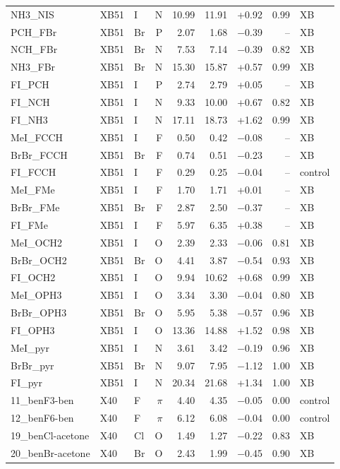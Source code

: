 \documentclass[journal=jcisd8,manuscript=suppinfo]{achemso}
\begin{document}
\begin{singlespace}
{\begin{longtable}{lllrrrrrl}
NH3\_NIS & XB51 & I & N & 10.99 & 11.91 & +0.92 & 0.99 & XB\\
PCH\_FBr & XB51 & Br & P & 2.07 & 1.68 & $-$0.39 & -- & XB\\
NCH\_FBr & XB51 & Br & N & 7.53 & 7.14 & $-$0.39 & 0.82 & XB\\
NH3\_FBr & XB51 & Br & N & 15.30 & 15.87 & +0.57 & 0.99 & XB\\
FI\_PCH & XB51 & I & P & 2.74 & 2.79 & +0.05 & -- & XB\\
FI\_NCH & XB51 & I & N & 9.33 & 10.00 & +0.67 & 0.82 & XB\\
FI\_NH3 & XB51 & I & N & 17.11 & 18.73 & +1.62 & 0.99 & XB\\
MeI\_FCCH & XB51 & I & F & 0.50 & 0.42 & $-$0.08 & -- & XB\\
BrBr\_FCCH & XB51 & Br & F & 0.74 & 0.51 & $-$0.23 & -- & XB\\
FI\_FCCH & XB51 & I & F & 0.29 & 0.25 & $-$0.04 & -- & control\\
MeI\_FMe & XB51 & I & F & 1.70 & 1.71 & +0.01 & -- & XB\\
BrBr\_FMe & XB51 & Br & F & 2.87 & 2.50 & $-$0.37 & -- & XB\\
FI\_FMe & XB51 & I & F & 5.97 & 6.35 & +0.38 & -- & XB\\
MeI\_OCH2 & XB51 & I & O & 2.39 & 2.33 & $-$0.06 & 0.81 & XB\\
BrBr\_OCH2 & XB51 & Br & O & 4.41 & 3.87 & $-$0.54 & 0.93 & XB\\
FI\_OCH2 & XB51 & I & O & 9.94 & 10.62 & +0.68 & 0.99 & XB\\
MeI\_OPH3 & XB51 & I & O & 3.34 & 3.30 & $-$0.04 & 0.80 & XB\\
BrBr\_OPH3 & XB51 & Br & O & 5.95 & 5.38 & $-$0.57 & 0.96 & XB\\
FI\_OPH3 & XB51 & I & O & 13.36 & 14.88 & +1.52 & 0.98 & XB\\
MeI\_pyr & XB51 & I & N & 3.61 & 3.42 & $-$0.19 & 0.96 & XB\\
BrBr\_pyr & XB51 & Br & N & 9.07 & 7.95 & $-$1.12 & 1.00 & XB\\
FI\_pyr & XB51 & I & N & 20.34 & 21.68 & +1.34 & 1.00 & XB\\
11\_benF3-ben & X40 & F & $\pi$ & 4.40 & 4.35 & $-$0.05 & 0.00 & control\\
12\_benF6-ben & X40 & F & $\pi$ & 6.12 & 6.08 & $-$0.04 & 0.00 & control\\
19\_benCl-acetone & X40 & Cl & O & 1.49 & 1.27 & $-$0.22 & 0.83 & XB\\
20\_benBr-acetone & X40 & Br & O & 2.43 & 1.99 & $-$0.45 & 0.90 & XB\\

\end{longtable}}
\end{singlespace}
\end{document}

